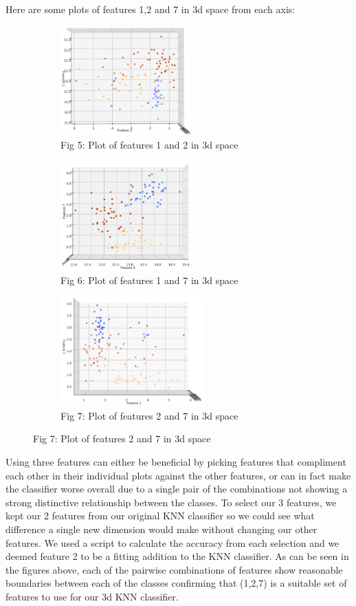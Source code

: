 \documentclass[10pt]{article}
\begin{document}
\noindent
Here are some plots of features 1,2 and 7 in 3d space from each axis:

\begin{figure}[h!]
\captionsetup[subfigure]{labelformat=empty}
\begin{subfigure}{.33\textwidth}
\centering
\includegraphics[height=4.2cm]{3d1x2.png}
\caption{Fig 5: Plot of features 1 and 2 in 3d space}
\end{subfigure}%
\begin{subfigure}{.33\textwidth}
\centering
\includegraphics[height=4.2cm]{3d1x7.png}
\caption{Fig 6: Plot of features 1 and 7 in 3d space}
\end{subfigure}%
\begin{subfigure}{.33\textwidth}
\centering
\includegraphics[height=4.2cm]{3d2x7.png}
\caption{Fig 7: Plot of features 2 and 7 in 3d space}
\end{subfigure}%
\end{figure}

\noindent
Using three features can either be beneficial by picking features that compliment each other in their individual plots against the other features, or can in fact make the classifier worse overall due to a single pair of the combinations not showing a strong distinctive relationship between the classes. To select our 3 features, we kept our 2 features from our original KNN classifier so we could see what difference a single new dimension would make without changing our other features. We used a script to calculate the accuracy from each selection and we deemed feature 2 to be a fitting addition to the KNN classifier.  As can be seen in the figures above, each of the pairwise combinations of features show reasonable boundaries between each of the classes confirming that (1,2,7) is a suitable set of features to use for our 3d KNN classifier. \\
\end{document}
